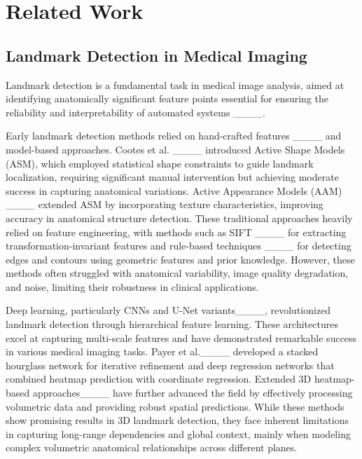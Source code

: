 \section{Related Work}
\label{sec.2}
\subsection{Landmark Detection in Medical Imaging}
Landmark detection is a fundamental task in medical image analysis, aimed at identifying anatomically significant feature points essential for ensuring the reliability and interpretability of automated systems ____. 

Early landmark detection methods relied on hand-crafted features ____ and model-based approaches. Cootes et al. ____ introduced Active Shape Models (ASM), which employed statistical shape constraints to guide landmark localization, requiring significant manual intervention but achieving moderate success in capturing anatomical variations. Active Appearance Models (AAM) ____ extended ASM by incorporating texture characteristics, improving accuracy in anatomical structure detection. These traditional approaches heavily relied on feature engineering, with methods such as SIFT ____ for extracting transformation-invariant features and rule-based techniques ____ for detecting edges and contours using geometric features and prior knowledge. However, these methods often struggled with anatomical variability, image quality degradation, and noise, limiting their robustness in clinical applications.


Deep learning, particularly CNNs and U-Net variants____, revolutionized landmark detection through hierarchical feature learning. These architectures excel at capturing multi-scale features and have demonstrated remarkable success in various medical imaging tasks. Payer et al.____ developed a stacked hourglass network for iterative refinement and deep regression networks that combined heatmap prediction with coordinate regression. Extended 3D heatmap-based approaches____ have further advanced the field by effectively processing volumetric data and providing robust spatial predictions. While these methods show promising results in 3D landmark detection, they face inherent limitations in capturing long-range dependencies and global context, mainly when modeling complex volumetric anatomical relationships across different planes.


